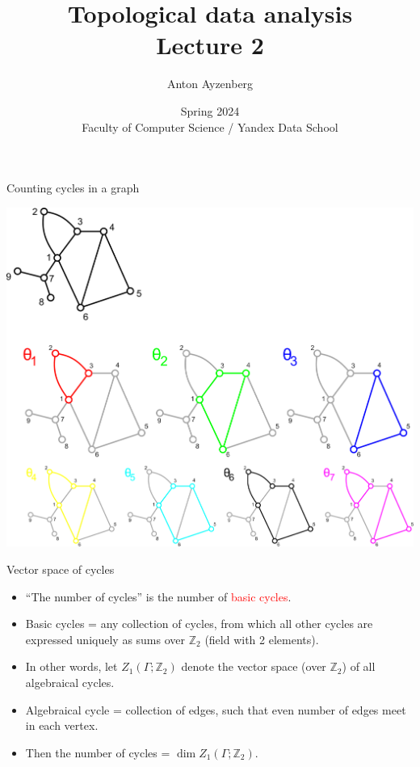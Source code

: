 \documentclass[10pt]{beamer}
\title[Topology intro]{Topological data analysis \\ Lecture 2}
\author[Anton Ayzenberg]{ Anton Ayzenberg }%
\date[FCS-YDS'24]{Spring 2024 \\ Faculty of Computer Science / Yandex Data School}
\institute[ATA \& Noeon Research]{ATA Lab, FCS NRU HSE \\ Noeon Research}
\newcommand{\Zo}{\mathbb{Z}}
\newcommand{\Zt}{\Zo_2}
\begin{document}
\maketitle



\begin{frame}{Counting cycles in a graph}

\begin{center}
\includegraphics[scale=0.12]{pictures/graphcycles.pdf}
\end{center}

\end{frame}

\begin{frame}{Vector space of cycles}

\begin{itemize}
  \item ``The number of cycles'' is the number of \textcolor{red}{basic cycles}.
  \item Basic cycles = any collection of cycles, from which all other cycles are expressed uniquely as sums over $\Zt$ (field with 2 elements).
  \item In other words, let $Z_1(\Gamma;\Zt)$ denote the vector space (over $\Zt$) of all algebraical cycles.
  \item Algebraical cycle = collection of edges, such that even number of edges meet in each vertex.
  \item Then the number of cycles = $\dim Z_1(\Gamma;\Zt)$.
\end{itemize}

\end{frame}
\end{document}
